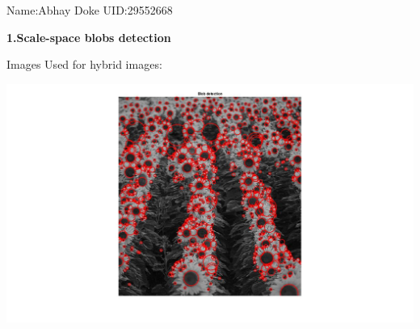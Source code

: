\documentclass[fleqn]{article}
\begin{document}
{Name:Abhay Doke {UID:29552668}}



\textbf{\huge 1.Scale-space blobs detection}


Images Used for hybrid images:
\vspace{10 mm}


\begin{center}
\includegraphics[width=1.2\textwidth]{sunflowers.jpg}


\end{center}
\end{document}
